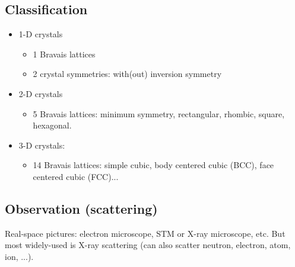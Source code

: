 \documentclass[11pt,letterpaper]{article}
\numberwithin{equation}{section} %
\begin{document}
\subsection{Classification}
\label{sub:classification}
\begin{itemize}
	\item 1-D crystals 
		\begin{itemize}
			\item 1 Bravais lattices
			\item 2 crystal symmetries: with(out) inversion symmetry
		\end{itemize}
	\item 2-D crystals 
		\begin{itemize}
			\item 5 Bravais lattices: minimum symmetry, rectangular, rhombic,
				square, hexagonal.
		\end{itemize}
	\item 3-D crystals: 
		\begin{itemize}
			\item 14 Bravais lattices: simple cubic, body centered cubic
				(BCC), face centered cubic (FCC)...
		\end{itemize}
\end{itemize}
\subsection{Observation (scattering)}
\label{sub:observation}
Real-space pictures: electron microscope, STM or X-ray microscope, etc. But
most widely-used is X-ray scattering (can also scatter neutron, electron,
atom, ion, ...). 
\end{document}

